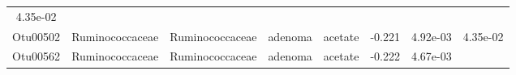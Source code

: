 \documentclass[11pt,]{article}
\begin{document}
\begin{longtable}[]{@{}cccccccc@{}}
\begin{minipage}[t]{0.08\columnwidth}
4.35e-02\strut
\end{minipage}\tabularnewline
\begin{minipage}[t]{0.08\columnwidth}\centering\strut
Otu00502\strut
\end{minipage} & \begin{minipage}[t]{0.15\columnwidth}\centering\strut
Ruminococcaceae\strut
\end{minipage} & \begin{minipage}[t]{0.15\columnwidth}\centering\strut
Ruminococcaceae\strut
\end{minipage} & \begin{minipage}[t]{0.08\columnwidth}\centering\strut
adenoma\strut
\end{minipage} & \begin{minipage}[t]{0.09\columnwidth}\centering\strut
acetate\strut
\end{minipage} & \begin{minipage}[t]{0.07\columnwidth}\centering\strut
-0.221\strut
\end{minipage} & \begin{minipage}[t]{0.08\columnwidth}\centering\strut
4.92e-03\strut
\end{minipage} & \begin{minipage}[t]{0.08\columnwidth}\centering\strut
4.35e-02\strut
\end{minipage}\tabularnewline
\begin{minipage}[t]{0.08\columnwidth}\centering\strut
Otu00562\strut
\end{minipage} & \begin{minipage}[t]{0.15\columnwidth}\centering\strut
Ruminococcaceae\strut
\end{minipage} & \begin{minipage}[t]{0.15\columnwidth}\centering\strut
Ruminococcaceae\strut
\end{minipage} & \begin{minipage}[t]{0.08\columnwidth}\centering\strut
adenoma\strut
\end{minipage} & \begin{minipage}[t]{0.09\columnwidth}\centering\strut
acetate\strut
\end{minipage} & \begin{minipage}[t]{0.07\columnwidth}\centering\strut
-0.222\strut
\end{minipage} & \begin{minipage}[t]{0.08\columnwidth}\centering\strut
4.67e-03\strut
\end{minipage} & \begin{minipage}[t]{0.08\columnwidth}\centering\strut

\end{minipage}
\end{longtable}
\end{document}
